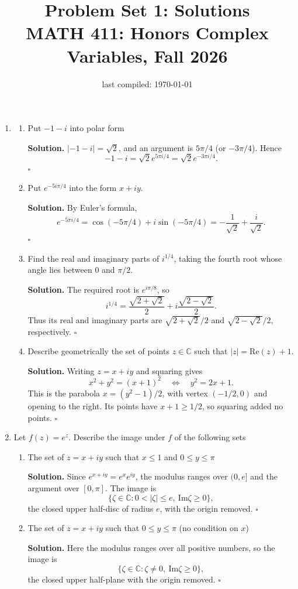 \documentclass[12pt, reqno]{amsart}
\title{Problem Set 1: Solutions \\ MATH 411: Honors Complex Variables, Fall 2026}
\date{last compiled: \today}
\theoremstyle{definition}
\newenvironment{solution}{\par\smallskip\noindent\textbf{Solution.}}{\hfill$\square$\par\medskip}
\numberwithin{equation}{subsection}
\renewcommand{\Re}{\mathrm{Re}}
\renewcommand{\Im}{\mathrm{Im}}
\numberwithin{equation}{section}
\begin{document}
\maketitle



\begin{enumerate}

\item
\begin{enumerate}

\item Put $-1 - i$ into polar form
\begin{solution}
$|-1-i|=\sqrt2$, and an argument is $5\pi/4$ (or $-3\pi/4$).  Hence
\[ -1-i=\sqrt2e^{5\pi i/4}=\sqrt2e^{-3\pi i/4}. \]
\end{solution}
\item Put $e^{- 5 i \pi /4}$ into the form $x + i y$.
\begin{solution}
By Euler's formula,
\[e^{-5\pi i/4}=\cos(-5\pi/4)+i\sin(-5\pi/4)
=-\frac1{\sqrt2}+\frac{i}{\sqrt2}.\]
\end{solution}
\item Find the real and imaginary parts of $i^{1/4}$, taking the fourth root whose angle lies between $0$ and $\pi/2$.
\begin{solution}
The required root is $e^{i\pi/8}$, so
\[i^{1/4}=\frac{\sqrt{2+\sqrt2}}2+i\frac{\sqrt{2-\sqrt2}}2.\]
Thus its real and imaginary parts are $\sqrt{2+\sqrt2}/2$ and
$\sqrt{2-\sqrt2}/2$, respectively.
\end{solution}
\item Describe geometrically the set of points $z \in \mathbb{C}$ such that $|z| = \Re(z)+1$.
\begin{solution}
Writing $z=x+iy$ and squaring gives
\[x^2+y^2=(x+1)^2\quad\Longleftrightarrow\quad y^2=2x+1.\]
This is the parabola $x=(y^2-1)/2$, with vertex $(-1/2,0)$ and opening
to the right.  Its points have $x+1\geq1/2$, so squaring added no points.
\end{solution}
\end{enumerate}
\item Let $f(z) = e^z$. Describe the image under $f$ of the following sets
\begin{enumerate}
\item The set of $z = x + i y $ such that $x \leq 1$ and $0 \leq y \leq \pi$
\begin{solution}
Since $e^{x+iy}=e^xe^{iy}$, the modulus ranges over $(0,e]$ and the
argument over $[0,\pi]$.  The image is
\[\{\zeta\in\mathbb C:0<|\zeta|\leq e,\ \Im\zeta\geq0\},\]
the closed upper half-disc of radius $e$, with the origin removed.
\end{solution}
\item The set of $z = x + i y $ such that $0 \leq y \leq \pi$ (no condition on $x$)
\begin{solution}
Here the modulus ranges over all positive numbers, so the image is
\[\{\zeta\in\mathbb C:\zeta\neq0,\ \Im\zeta\geq0\},\]
the closed upper half-plane with the origin removed.
\end{solution}
\end{enumerate}


\end{enumerate}
\end{document}
